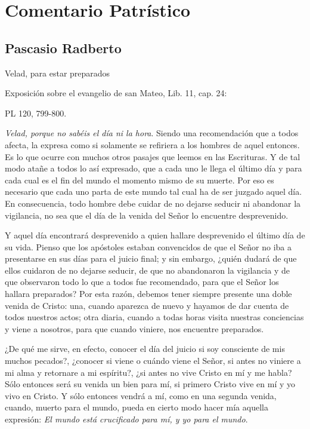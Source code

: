 \section{Comentario Patrístico}

\subsection{Pascasio Radberto}

Velad, para estar preparados

Exposición sobre el evangelio de san Mateo, Lib. 11, cap. 24:

PL 120, 799-800.

\emph{Velad, porque no sabéis el día ni la hora}. Siendo una recomendación que a todos afecta, la expresa como si solamente se refiriera a los hombres de aquel entonces. Es lo que ocurre con muchos otros pasajes que leemos en las Escrituras. Y de tal modo atañe a todos lo así expresado, que a cada uno le llega el último día y para cada cual es el fin del mundo el momento mismo de su muerte. Por eso es necesario que cada uno parta de este mundo tal cual ha de ser juzgado aquel día. En consecuencia, todo hombre debe cuidar de no dejarse seducir ni abandonar la vigilancia, no sea que el día de la venida del Señor lo encuentre desprevenido.

Y aquel día encontrará desprevenido a quien hallare desprevenido el último día de su vida. Pienso que los apóstoles estaban convencidos de que el Señor no iba a presentarse en sus días para el juicio final; y sin embargo, ¿quién dudará de que ellos cuidaron de no dejarse seducir, de que no abandonaron la vigilancia y de que observaron todo lo que a todos fue recomendado, para que el Señor los hallara preparados? Por esta razón, debemos tener siempre presente una doble venida de Cristo: una, cuando aparezca de nuevo y hayamos de dar cuenta de todos nuestros actos; otra diaria, cuando a todas horas visita nuestras conciencias y viene a nosotros, para que cuando viniere, nos encuentre preparados.

¿De qué me sirve, en efecto, conocer el día del juicio si soy consciente de mis muchos pecados?, ¿conocer si viene o cuándo viene el Señor, si antes no viniere a mi alma y retornare a mi espíritu?, ¿si antes no vive Cristo en mí y me habla? Sólo entonces será su venida un bien para mí, si primero Cristo vive en mí y yo vivo en Cristo. Y sólo entonces vendrá a mí, como en una segunda venida, cuando, muerto para el mundo, pueda en cierto modo hacer mía aquella expresión: \emph{El mundo está crucificado para mí, y yo para el mundo}.

